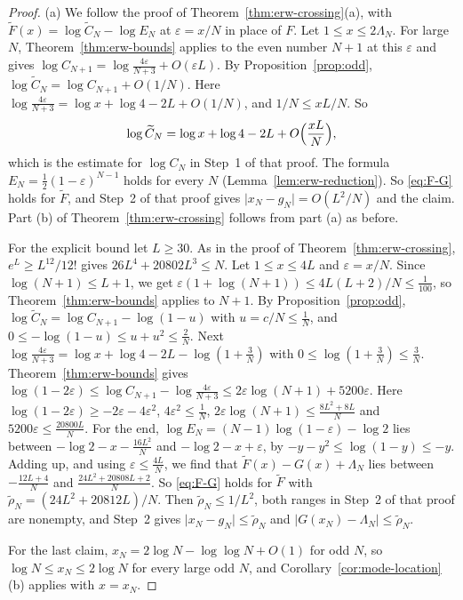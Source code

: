 \begin{proof}
(a) We follow the proof of Theorem~\ref{thm:erw-crossing}(a), with
$\widetilde F(x)=\log\widetilde C_N-\log E_N$ at $\varepsilon=x/N$ in place of $F$. Let
$1\le x\le2\Lambda_N$. For large $N$, Theorem~\ref{thm:erw-bounds} applies to the even number
$N+1$ at this $\varepsilon$ and gives
$\log C_{N+1}=\log\frac{4\varepsilon}{N+3}+O(\varepsilon L)$. By Proposition~\ref{prop:odd},
$\log\widetilde C_N=\log C_{N+1}+O(1/N)$. Here $\log\frac{4\varepsilon}{N+3}=\log x+\log4-2L+O(1/N)$,
and $1/N\le xL/N$. So
\[
 \log\widetilde C_N=\log x+\log4-2L+O\Bigl(\frac{xL}N\Bigr),
\]
which is the estimate for $\log C_N$ in Step~1 of that proof. The formula
$E_N=\frac12(1-\varepsilon)^{N-1}$ holds for every $N$ (Lemma~\ref{lem:erw-reduction}). So
\eqref{eq:F-G} holds for $\widetilde F$, and Step~2 of that proof gives
$\lvert x_N-g_N\rvert=O(L^2/N)$ and the claim. Part (b) of Theorem~\ref{thm:erw-crossing} follows
from part (a) as before.

For the explicit bound let $L\ge30$. As in the proof of Theorem~\ref{thm:erw-crossing},
$e^L\ge L^{12}/12!$ gives $26L^4+20802L^3\le N$. Let $1\le x\le4L$ and $\varepsilon=x/N$. Since
$\log(N+1)\le L+1$, we get $\varepsilon(1+\log(N+1))\le4L(L+2)/N\le\frac1{100}$, so
Theorem~\ref{thm:erw-bounds} applies to $N+1$. By Proposition~\ref{prop:odd},
$\log\widetilde C_N=\log C_{N+1}-\log(1-u)$ with $u=c/N\le\frac1N$, and
$0\le-\log(1-u)\le u+u^2\le\frac2N$. Next
$\log\frac{4\varepsilon}{N+3}=\log x+\log4-2L-\log(1+\frac3N)$ with
$0\le\log(1+\frac3N)\le\frac3N$. Theorem~\ref{thm:erw-bounds} gives
$\log(1-2\varepsilon)\le\log C_{N+1}-\log\frac{4\varepsilon}{N+3}\le2\varepsilon\log(N+1)+5200\varepsilon$.
Here $\log(1-2\varepsilon)\ge-2\varepsilon-4\varepsilon^2$, $4\varepsilon^2\le\frac1N$,
$2\varepsilon\log(N+1)\le\frac{8L^2+8L}N$ and $5200\varepsilon\le\frac{20800L}N$. For the end,
$\log E_N=(N-1)\log(1-\varepsilon)-\log2$ lies between $-\log2-x-\frac{16L^2}N$ and
$-\log2-x+\varepsilon$, by $-y-y^2\le\log(1-y)\le-y$. Adding up, and using
$\varepsilon\le\frac{4L}N$, we find that $\widetilde F(x)-G(x)+\Lambda_N$ lies between
$-\frac{12L+4}N$ and $\frac{24L^2+20808L+2}N$. So \eqref{eq:F-G} holds for $\widetilde F$ with
$\tilde\rho_N=(24L^2+20812L)/N$. Then $\tilde\rho_N\le1/L^2$, both ranges in Step~2 of that
proof are nonempty, and Step~2 gives $\lvert x_N-g_N\rvert\le\tilde\rho_N$ and
$\lvert G(x_N)-\Lambda_N\rvert\le\tilde\rho_N$.

For the last claim, $x_N=2\log N-\log\log N+O(1)$ for odd $N$, so
$\log N\le x_N\le2\log N$ for every large odd $N$, and Corollary~\ref{cor:mode-location}(b)
applies with $x=x_N$.


\end{proof}
